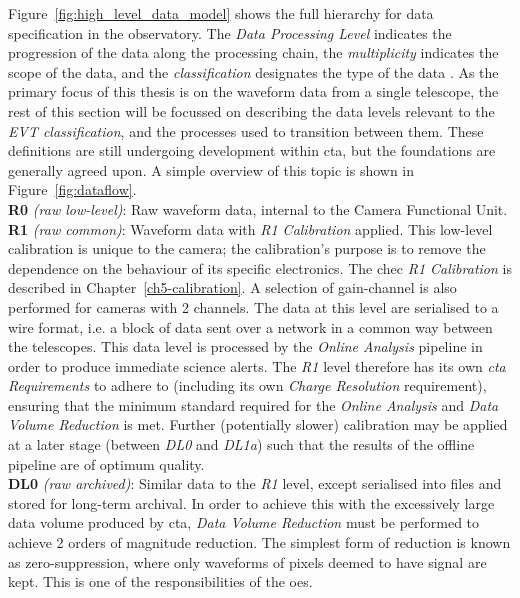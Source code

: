 Figure~\ref{fig:high_level_data_model} shows the full hierarchy for data specification in the observatory. The \textit{Data Processing Level} indicates the progression of the data along the processing chain, the \textit{multiplicity} indicates the scope of the data, and the \textit{classification} designates the type of the data \cite{Kosack2017}. As the primary focus of this thesis is on the waveform data from a single telescope, the rest of this section will be focussed on describing the data levels relevant to the \textit{EVT classification}, and the processes used to transition between them. These definitions are still undergoing development within \gls{cta}, but the foundations are generally agreed upon. A simple overview of this topic is shown in Figure~\ref{fig:dataflow}.
\\[4pt]
\indent\textbf{R0} \textit{(raw low-level)}:
Raw waveform data, internal to the Camera Functional Unit.
\\[4pt]
\indent\textbf{R1} \textit{(raw common)}:
Waveform data with \textit{R1 Calibration} applied. This low-level calibration is unique to the camera; the calibration's purpose is to remove the dependence on the behaviour of its specific electronics. The \gls{chec} \textit{R1 Calibration} is described in Chapter~\ref{ch5-calibration}. A selection of gain-channel is also performed for cameras with 2 channels. The data at this level are serialised to a wire format, i.e. a block of data sent over a network in a common way between the telescopes. This data level is processed by the \textit{Online Analysis} pipeline in order to produce immediate science alerts. The \textit{R1} level therefore has its own \textit{\gls{cta} Requirements} to adhere to (including its own \textit{Charge Resolution} requirement), ensuring that the minimum standard required for the \textit{Online Analysis} and \textit{Data Volume Reduction} is met. Further (potentially slower) calibration may be applied at a later stage (between \textit{DL0} and \textit{DL1a}) such that the results of the offline pipeline are of optimum quality.
\\[4pt]
\indent\textbf{DL0} \textit{(raw archived)}: Similar data to the \textit{R1} level, except serialised into files and stored for long-term archival. In order to achieve this with the excessively large data volume produced by \gls{cta}, \textit{Data Volume Reduction} must be performed to achieve 2 orders of magnitude reduction. The simplest form of reduction is known as zero-suppression, where only waveforms of pixels deemed to have signal are kept. This is one of the responsibilities of the \gls{oes}.
